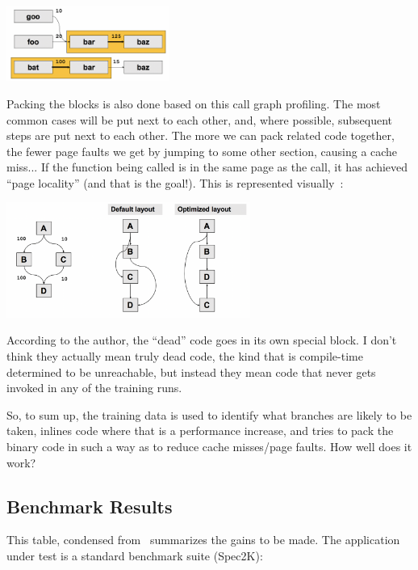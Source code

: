 \documentclass[a4paper]{report}
\begin{document}
\begin{center}
	\includegraphics[width=0.4\textwidth]{images/callpaths4.png}
\end{center}

Packing the blocks is also done based on this call graph profiling. The most common cases will be put next to each other, and, where possible, subsequent steps are put next to each other. The more we can pack related code together, the fewer page faults we get by jumping to some other section, causing a cache miss... If the function being called is in the same page as the call, it has achieved ``page locality'' (and that is the goal!). This is represented visually~\cite{pogo2}:

\begin{center}
	\includegraphics[width=0.6\textwidth]{images/blocklayout.png}
\end{center}

According to the author, the ``dead'' code goes in its own special block. I don't think they actually mean truly dead code, the kind that is compile-time determined to be unreachable, but instead they mean code that never gets invoked in any of the training runs.

So, to sum up, the training data is used to identify what branches are likely to be taken, inlines code where that is a performance increase, and tries to pack the binary code in such a way as to reduce cache misses/page faults. How well does it work?

\subsection*{Benchmark Results}

This table, condensed from~\cite{pogo2} summarizes the gains to be made. The application under test is a standard benchmark suite (Spec2K):
\end{document}
